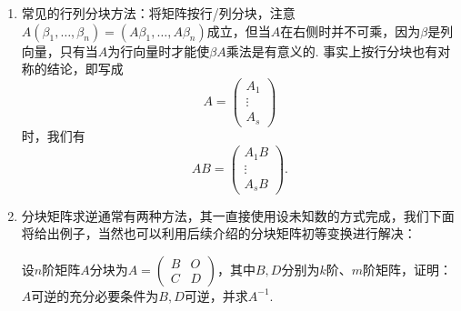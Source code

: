 \begin{enumerate}
    \item 常见的行列分块方法：将矩阵按行/列分块，注意$A(\beta_1,\ldots,\beta_n)=(A\beta_1,\ldots,A\beta_n)$成立，但当$A$在右侧时并不可乘，因为$\beta$是列向量，只有当$A$为行向量时才能使$\beta A$乘法是有意义的. 事实上按行分块也有对称的结论，即写成
          \[A=\begin{pmatrix}
                  A_1 \\ \vdots \\ A_s
              \end{pmatrix}\]
          时，我们有
          \[AB=\begin{pmatrix}
                  A_1B \\ \vdots \\ A_sB
              \end{pmatrix}.\]

    \item 分块矩阵求逆通常有两种方法，其一直接使用设未知数的方式完成，我们下面将给出例子，当然也可以利用后续介绍的分块矩阵初等变换进行解决：
          \begin{example}
              设$n$阶矩阵$A$分块为$A=\begin{pmatrix}
                      B & O \\ C & D
                  \end{pmatrix}$，其中$B,D$分别为$k$阶、$m$阶矩阵，证明：$A$可逆的充分必要条件为$B,D$可逆，并求$A^{-1}$.
          \end{example}


\end{enumerate}
